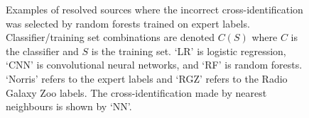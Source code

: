 \documentclass[fleqn,usenatbib,usedcolumn]{mnras}
\begin{document}
\begin{figure}
        \caption{\label{fig:examples} Examples of resolved sources where the incorrect cross-identification was selected by random forests trained on expert labels. Classifier/training set combinations are denoted $C(S)$ where $C$ is the classifier and $S$ is the training set. `LR' is logistic regression, `CNN' is convolutional neural networks, and `RF' is random forests. `Norris' refers to the expert labels and `RGZ' refers to the Radio Galaxy Zoo labels. The cross-identification made by nearest neighbours is shown by `NN'.}
    \end{figure}
\end{document}
